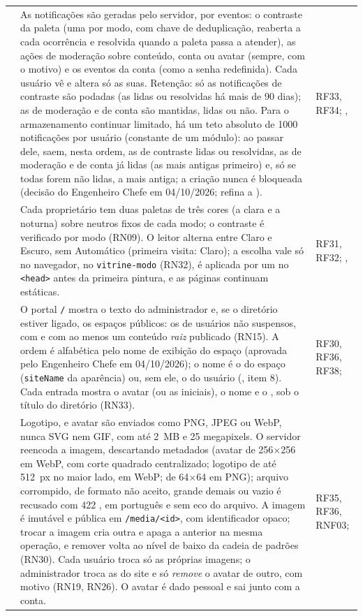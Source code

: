 \begin{longtable}{@{}L{1.3cm}L{9.6cm}L{2.8cm}@{}}
 & As notificações são geradas pelo servidor, por eventos: o contraste da paleta (uma por modo, com chave de deduplicação, reaberta a cada ocorrência e resolvida quando a paleta passa a atender), as ações de moderação sobre conteúdo, conta ou avatar (sempre, com o motivo) e os eventos da conta (como a senha redefinida). Cada usuário vê e altera só as suas. Retenção: só as notificações de contraste são podadas (as lidas ou resolvidas há mais de 90 dias); as de moderação e de conta são mantidas, lidas ou não. Para o armazenamento continuar limitado, há um teto absoluto de 1000 notificações por usuário (constante de um módulo): ao passar dele, saem, nesta ordem, as de contraste lidas ou resolvidas, as de moderação e de conta já lidas (as mais antigas primeiro) e, só se todas forem não lidas, a mais antiga; a criação nunca é bloqueada (decisão do Engenheiro Chefe em 04/10/2026; refina a ). & RF33, RF34; , \\[1pt]
 & Cada proprietário tem duas paletas de três cores (a clara e a noturna) sobre neutros fixos de cada modo; o contraste é verificado por modo (RN09). O leitor alterna entre Claro e Escuro, sem Automático (primeira visita: Claro); a escolha vale só no navegador, no  \texttt{vitrine-modo} (RN32), é aplicada por um  no \texttt{<head>} antes da primeira pintura, e as páginas continuam estáticas. & RF31, RF32; , \\[1pt]
 & O portal \texttt{/} mostra o texto do administrador e, se o diretório estiver ligado, os espaços públicos: os de usuários não suspensos, com  e com ao menos um conteúdo \emph{raiz} publicado (RN15). A ordem é alfabética pelo nome de exibição do espaço (aprovada pelo Engenheiro Chefe em 04/10/2026); o nome é o do espaço (\texttt{siteName} da aparência) ou, sem ele, o do usuário (, item 8). Cada entrada mostra o avatar (ou as iniciais), o nome e o , sob o título do diretório (RN33). & RF30, RF36, RF38; \\[1pt]
 & Logotipo,  e avatar são enviados como PNG, JPEG ou WebP, nunca SVG nem GIF, com até 2~MB e 25 megapixels. O servidor reencoda a imagem, descartando metadados (avatar de 256$\times$256 em WebP, com corte quadrado centralizado; logotipo de até 512~px no maior lado, em WebP;  de 64$\times$64 em PNG); arquivo corrompido, de formato não aceito, grande demais ou vazio é recusado com 422 , em português e sem eco do arquivo. A imagem é imutável e pública em \texttt{/media/<id>}, com identificador opaco; trocar a imagem cria outra e apaga a anterior na mesma operação, e remover volta ao nível de baixo da cadeia de padrões (RN30). Cada usuário troca só as próprias imagens; o administrador troca as do site e só \emph{remove} o avatar de outro, com motivo (RN19, RN26). O avatar é dado pessoal e sai junto com a conta. & RF35, RF36, RNF03; \\[1pt]

\end{longtable}
